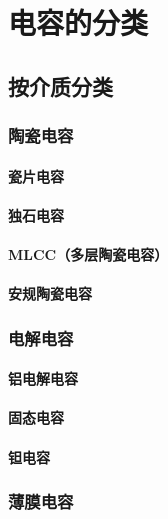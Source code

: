 \documentclass[12pt,UTF8]{ctexbook}
\begin{document}
\chapter{电容的分类}

\section{按介质分类}

\subsection{陶瓷电容}

\subsubsection{瓷片电容}

\subsubsection{独石电容}

\subsubsection{MLCC（多层陶瓷电容）}

\subsubsection{安规陶瓷电容}

\subsection{电解电容}

\subsubsection{铝电解电容}

\subsubsection{固态电容}

\subsubsection{钽电容}

\subsection{薄膜电容}
\end{document}
